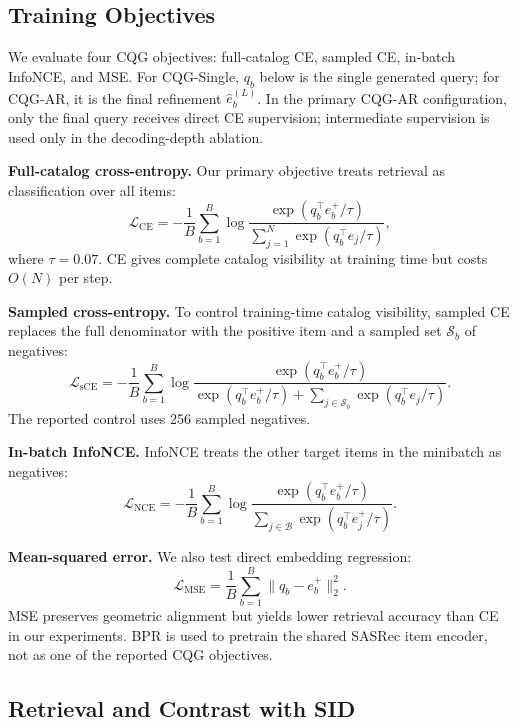 \documentclass[preprint,12pt]{elsarticle}
\begin{document}
\subsection{Training Objectives}

We evaluate four CQG objectives: full-catalog CE, sampled CE, in-batch
InfoNCE, and MSE. For CQG-Single, $q_b$ below is the single generated query;
for CQG-AR, it is the final refinement $\hat e_b^{(L)}$. In the primary
CQG-AR configuration, only the final query receives direct CE supervision;
intermediate supervision is used only in the decoding-depth ablation.

\textbf{Full-catalog cross-entropy.}
Our primary objective treats retrieval as classification over all items:
\begin{equation}
\mathcal{L}_{\mathrm{CE}}
= -\frac{1}{B}\sum_{b=1}^{B}
\log
\frac{\exp(q_b^\top e_b^+/\tau)}
{\sum_{j=1}^{N}\exp(q_b^\top e_j/\tau)} ,
\end{equation}
where $\tau=0.07$. CE gives complete catalog visibility at training time but costs $O(N)$ per step.

\textbf{Sampled cross-entropy.}
To control training-time catalog visibility, sampled CE replaces the full
denominator with the positive item and a sampled set
\(\mathcal S_b\) of negatives:
\begin{equation}
\mathcal{L}_{\mathrm{sCE}}
=-\frac{1}{B}\sum_{b=1}^{B}\log
\frac{\exp(q_b^\top e_b^+/\tau)}
{\exp(q_b^\top e_b^+/\tau)+
\sum_{j\in\mathcal S_b}\exp(q_b^\top e_j/\tau)} .
\end{equation}
The reported control uses 256 sampled negatives.

\textbf{In-batch InfoNCE.}
InfoNCE treats the other target items in the minibatch as negatives:
\begin{equation}
\mathcal{L}_{\mathrm{NCE}}
=-\frac{1}{B}\sum_{b=1}^{B}\log
\frac{\exp(q_b^\top e_b^+/\tau)}
{\sum_{j\in\mathcal B}\exp(q_b^\top e_j^+/\tau)} .
\end{equation}

\textbf{Mean-squared error.}
We also test direct embedding regression:
\begin{equation}
\mathcal{L}_{\mathrm{MSE}}
=\frac{1}{B}\sum_{b=1}^{B}\|q_b-e_b^+\|_2^2 .
\end{equation}
MSE preserves geometric alignment but yields lower retrieval accuracy than CE
in our experiments. BPR is used to pretrain the shared SASRec item encoder,
not as one of the reported CQG objectives.

\subsection{Retrieval and Contrast with SID}
\end{document}
